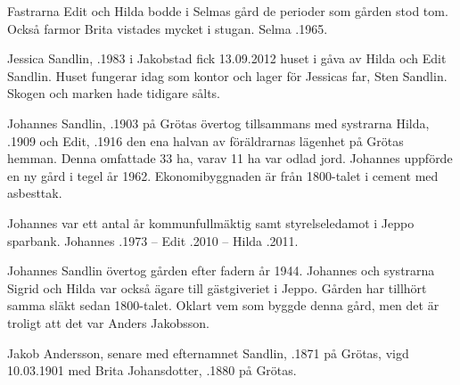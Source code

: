 Fastrarna Edit och Hilda bodde i Selmas gård de perioder som gården stod tom. Också farmor Brita vistades mycket i stugan. Selma .1965.




Jessica Sandlin, .1983 i Jakobstad fick 13.09.2012 huset i gåva av Hilda och Edit Sandlin. Huset fungerar idag som kontor och lager för Jessicas far, Sten Sandlin. Skogen och marken hade tidigare sålts.


Johannes Sandlin, .1903 på Grötas övertog tillsammans med systrarna Hilda, .1909 och Edit, .1916 den ena halvan av föräldrarnas lägenhet på Grötas hemman. Denna omfattade 33 ha, varav 11 ha var odlad jord. Johannes uppförde en ny gård i tegel år 1962. Ekonomibyggnaden är från 1800-talet i cement med asbesttak.

Johannes var ett antal år kommunfullmäktig samt styrelseledamot i Jeppo sparbank.
Johannes .1973  --  Edit .2010  --  Hilda .2011.



Johannes Sandlin övertog gården efter fadern år 1944. Johannes och systrarna Sigrid och Hilda var också ägare till gästgiveriet i Jeppo. Gården har tillhört samma släkt sedan 1800-talet. Oklart vem som byggde denna gård, men det är troligt att det var Anders Jakobsson.


Jakob Andersson, senare med efternamnet Sandlin, .1871 på Grötas, vigd 10.03.1901 med Brita Johansdotter, .1880 på Grötas.


